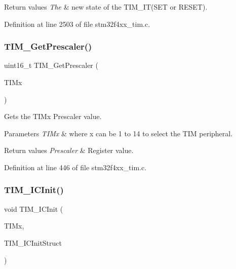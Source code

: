 \begin{DoxyRetVals}{Return values}
{\em The} & new state of the T\+I\+M\+\_\+\+I\+T(\+S\+E\+T or R\+E\+S\+E\+T). \\
\hline
\end{DoxyRetVals}


Definition at line 2503 of file stm32f4xx\+\_\+tim.\+c.

\mbox{\label{group___t_i_m_ga427eb6e533480e02a27cd0ca876183d6}} 
\subsubsection{\texorpdfstring{T\+I\+M\+\_\+\+Get\+Prescaler()}{TIM\_GetPrescaler()}}
{\footnotesize\ttfamily uint16\+\_\+t T\+I\+M\+\_\+\+Get\+Prescaler (\begin{DoxyParamCaption}\item[{\hyperlink{struct_t_i_m___type_def}{T\+I\+M\+\_\+\+Type\+Def} $\ast$}]{T\+I\+Mx }\end{DoxyParamCaption})}



Gets the T\+I\+Mx Prescaler value. 


\begin{DoxyParams}{Parameters}
{\em T\+I\+Mx} & where x can be 1 to 14 to select the T\+IM peripheral. \\
\hline
\end{DoxyParams}

\begin{DoxyRetVals}{Return values}
{\em Prescaler} & Register value. \\
\hline
\end{DoxyRetVals}


Definition at line 446 of file stm32f4xx\+\_\+tim.\+c.

\mbox{\label{group___t_i_m_ga9e6a153dd6552e4e1188eba227316f7f}} 
\subsubsection{\texorpdfstring{T\+I\+M\+\_\+\+I\+C\+Init()}{TIM\_ICInit()}}
{\footnotesize\ttfamily void T\+I\+M\+\_\+\+I\+C\+Init (\begin{DoxyParamCaption}\item[{\hyperlink{struct_t_i_m___type_def}{T\+I\+M\+\_\+\+Type\+Def} $\ast$}]{T\+I\+Mx,  }\item[{\hyperlink{struct_t_i_m___i_c_init_type_def}{T\+I\+M\+\_\+\+I\+C\+Init\+Type\+Def} $\ast$}]{T\+I\+M\+\_\+\+I\+C\+Init\+Struct }\end{DoxyParamCaption})}



